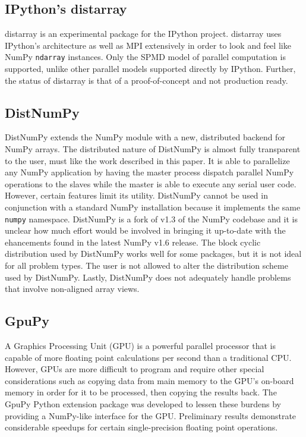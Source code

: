 \documentclass{sigplanconf}
\begin{document}
\subsection{IPython's distarray}

distarray \cite{Per09} is an experimental package for the IPython project.
distarray uses IPython’s architecture as well as MPI extensively in order to
look and feel like NumPy \verb=ndarray= instances. Only the SPMD model of
parallel computation is supported, unlike other parallel models supported
directly by IPython.  Further, the status of distarray is that of a
proof-of-concept and not production ready.

\subsection{DistNumPy}

DistNumPy \cite{Kri10} extends the NumPy module with a new, distributed
backend for NumPy arrays. The distributed nature of DistNumPy is almost fully
transparent to the user, must like the work described in this paper. It is
able to parallelize any NumPy application by having the master process
dispatch parallel NumPy operations to the slaves while the master is able to
execute any serial user code. However, certain features limit its utility.
DistNumPy cannot be used in conjunction with a standard NumPy installation
because it implements the same \texttt{numpy} namespace. DistNumPy is a fork
of v1.3 of the NumPy codebase and it is unclear how much effort would be
involved in bringing it up-to-date with the ehancements found in the latest
NumPy v1.6 release. The block cyclic distribution used by DistNumPy works well
for some packages, but it is not ideal for all problem types. The user is not
allowed to alter the distribution scheme used by DistNumPy. Lastly, DistNumPy
does not adequately handle problems that involve non-aligned array views.

\subsection{GpuPy}

A Graphics Processing Unit (GPU) is a powerful parallel processor that is
capable of more floating point calculations per second than a traditional CPU.
However, GPUs are more difficult to program and require other special
considerations such as copying data from main memory to the GPU’s on-board
memory in order for it to be processed, then copying the results back. The
GpuPy \cite{Eit07} Python extension package was developed to lessen these
burdens by providing a NumPy-like interface for the GPU. Preliminary results
demonstrate considerable speedups for certain single-precision floating point
operations.
\end{document}
